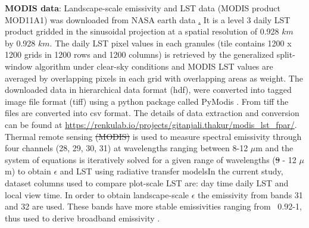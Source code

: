 \documentclass[fleqn,10pt]{wlscirep}
\providecommand{\DIFaddtex}[1]{{\protect\color{blue}\uwave{#1}}} %
\providecommand{\DIFdeltex}[1]{{\protect\color{red}\sout{#1}}}                      %
\providecommand{\DIFaddbegin}{} %
\providecommand{\DIFaddend}{} %
\providecommand{\DIFdelbegin}{} %
\providecommand{\DIFdelend}{} %
\providecommand{\DIFadd}[1]{\texorpdfstring{\DIFaddtex{#1}}{#1}} %
\providecommand{\DIFdel}[1]{\texorpdfstring{\DIFdeltex{#1}}{}} %
\begin{document}
\textbf{MODIS data}:
Landscape-scale emissivity and LST data (MODIS product MOD11A1) was downloaded from NASA earth data \href{https://lpdaac.usgs.gov/}. It is a level 3 daily LST product gridded in the sinusoidal projection at a spatial resolution of 0.928 \DIFdelbegin \DIFdel{$km$ }\DIFdelend \DIFaddbegin \DIFadd{km }\DIFaddend by 0.928 \DIFdelbegin \DIFdel{$km$}\DIFdelend \DIFaddbegin \DIFadd{km}\DIFaddend . The daily LST pixel values in each granules (tile contains 1200 x 1200 grids in 1200 rows and 1200 columns) is retrieved by the generalized split-window algorithm under clear-sky conditions and MODIS LST values are averaged by overlapping pixels in each grid with overlapping areas as weight\cite{wan2007collection}. The downloaded data in hierarchical data format (hdf), were converted into tagged image file format (tiff) using a python package called PyModis \cite{delucchi2014pymodis}. From tiff the files are converted into csv format. The details of data extraction and conversion can be found at \url{https://renkulab.io/projects/gitanjali.thakur/modis_lst_fpar/}.
Thermal remote sensing \DIFdelbegin \DIFdel{(MODIS) }\DIFdelend is used to measure spectral emissivity through four channels (28, 29, 30, 31) at wavelengths ranging between 8-12 $\mu$m \cite{jin2006improved} and the system of equations is iteratively solved for a given range of wavelengths (\DIFdelbegin \DIFdel{9 }\DIFdelend \DIFaddbegin \DIFadd{8 }\DIFaddend - 12 $\mu$m) to obtain $\epsilon$ and LST using radiative transfer models\cite{hulley2012quantifying,jin2006improved,wang2009evaluation}\DIFaddbegin \DIFadd{. }\DIFaddend In the current study,  dataset columns used to compare plot-scale LST are: day time daily LST and local view time. In order to obtain landscape-scale $\epsilon$ the emissivity from bands 31 and 32 are used. These bands have more stable emissivities ranging from ~0.92-1, thus used to derive broadband emissivity \cite{wan2007collection}. 
\end{document}
